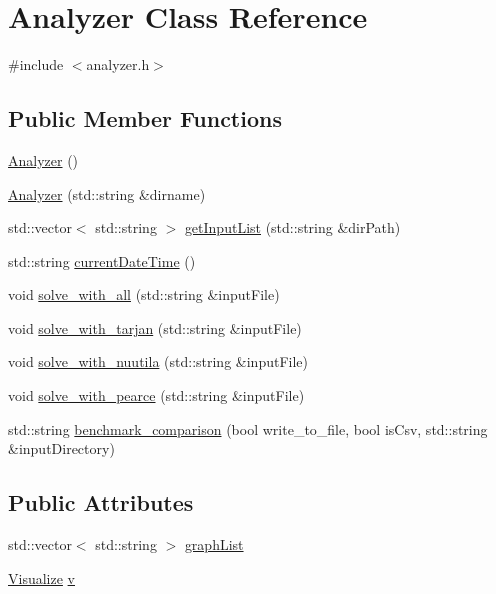 \hypertarget{class_analyzer}{}\section{Analyzer Class Reference}
\label{class_analyzer}


{\ttfamily \#include $<$analyzer.\+h$>$}

\subsection*{Public Member Functions}
\begin{DoxyCompactItemize}
\item 
\hyperlink{class_analyzer_a1be2ff17bba265bdef6e1b44748eaf96_a1be2ff17bba265bdef6e1b44748eaf96}{Analyzer} ()
\item 
\hyperlink{class_analyzer_a2aed8194a48a8385ef271af3bd6fdd42_a2aed8194a48a8385ef271af3bd6fdd42}{Analyzer} (std\+::string \&dirname)
\item 
std\+::vector$<$ std\+::string $>$ \hyperlink{class_analyzer_a7903ffdba689848dd199139e5dacf1bc_a7903ffdba689848dd199139e5dacf1bc}{get\+Input\+List} (std\+::string \&dir\+Path)
\item 
std\+::string \hyperlink{class_analyzer_a9108681fee1078aed1af2ddee58cc55c_a9108681fee1078aed1af2ddee58cc55c}{current\+Date\+Time} ()
\item 
void \hyperlink{class_analyzer_a471ed64111b58f49cfee911b5db93ada_a471ed64111b58f49cfee911b5db93ada}{solve\+\_\+with\+\_\+all} (std\+::string \&input\+File)
\item 
void \hyperlink{class_analyzer_a8207cd71986d26dc8abda1a807490ab2_a8207cd71986d26dc8abda1a807490ab2}{solve\+\_\+with\+\_\+tarjan} (std\+::string \&input\+File)
\item 
void \hyperlink{class_analyzer_a5ac77dbb2bbea6b34af561272705d64e_a5ac77dbb2bbea6b34af561272705d64e}{solve\+\_\+with\+\_\+nuutila} (std\+::string \&input\+File)
\item 
void \hyperlink{class_analyzer_a6009c58addbb9730b54580a5f01ddce7_a6009c58addbb9730b54580a5f01ddce7}{solve\+\_\+with\+\_\+pearce} (std\+::string \&input\+File)
\item 
std\+::string \hyperlink{class_analyzer_ae4637e33a985efefebf2a10502be351c_ae4637e33a985efefebf2a10502be351c}{benchmark\+\_\+comparison} (bool write\+\_\+to\+\_\+file, bool is\+Csv, std\+::string \&input\+Directory)
\end{DoxyCompactItemize}
\subsection*{Public Attributes}
\begin{DoxyCompactItemize}
\item 
std\+::vector$<$ std\+::string $>$ \hyperlink{class_analyzer_a567b5d8b2bbdde28b489834c1644446e_a567b5d8b2bbdde28b489834c1644446e}{graph\+List}
\item 
\hyperlink{class_visualize}{Visualize} \hyperlink{class_analyzer_ae32079d0816589617a0c76b1d4cf881b_ae32079d0816589617a0c76b1d4cf881b}{v}
\end{DoxyCompactItemize}


